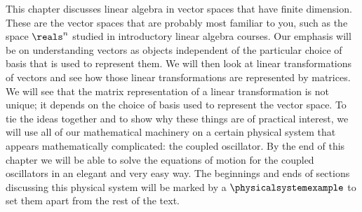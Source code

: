 
This chapter discusses linear algebra in vector spaces that have finite dimension.
These are the vector spaces that are probably most familiar to you, such as the space $\reals^{n}$ studied in introductory linear algebra courses.
Our emphasis will be on understanding vectors as objects independent of the particular choice of basis that is used to represent them.
We will then look at linear transformations of vectors and see how those linear transformations are represented by matrices.
We will see that the matrix representation of a linear transformation is not unique; it depends on the choice of basis used to represent the vector space.
To tie the ideas together and to show why these things are of practical interest, we will use all of our mathematical machinery on a certain physical system that appears mathematically complicated: the coupled oscillator.
By the end of this chapter we will be able to solve the equations of motion for the coupled oscillators in an elegant and very easy way.
The beginnings and ends of sections discussing this physical system will be marked by a $\physicalsystemexample$ to set them apart from the rest of the text.


